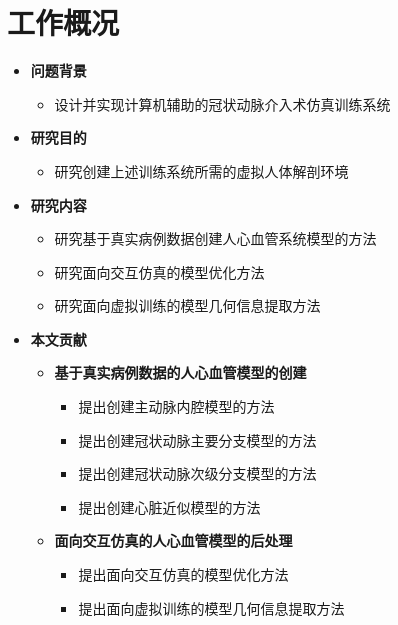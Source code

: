 \section{工作概况}

\begin{frame}
\begin{itemize}
\item \textbf{问题背景}
\begin{itemize}
\item 设计并实现计算机辅助的冠状动脉介入术仿真训练系统
\end{itemize}
\end{itemize}
\begin{itemize}
\item \textbf{研究目的}
\begin{itemize}
\item 研究创建上述训练系统所需的虚拟人体解剖环境
\end{itemize}
\end{itemize}
\begin{itemize}
\item \textbf{研究内容}
\begin{itemize}
\item 研究基于真实病例数据创建人心血管系统模型的方法
\item 研究面向交互仿真的模型优化方法
\item 研究面向虚拟训练的模型几何信息提取方法
\end{itemize}
\end{itemize}
\end{frame}

\begin{frame}

\end{frame}

\begin{frame}

\end{frame}

\begin{frame}
\begin{itemize}
  \item \textbf{本文贡献}
  \begin{itemize}
    \item \textbf{基于真实病例数据的人心血管模型的创建}
    \begin{itemize}
      \item 提出创建主动脉内腔模型的方法
      \item 提出创建冠状动脉主要分支模型的方法
      \item 提出创建冠状动脉次级分支模型的方法
      \item 提出创建心脏近似模型的方法
    \end{itemize}
    \item \textbf{面向交互仿真的人心血管模型的后处理}
    \begin{itemize}
      \item 提出面向交互仿真的模型优化方法
      \item 提出面向虚拟训练的模型几何信息提取方法
    \end{itemize}
  \end{itemize}
\end{itemize}
\end{frame} 